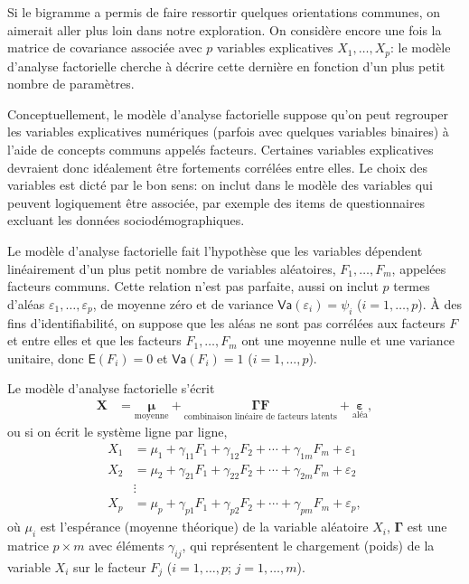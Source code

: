 \documentclass[
  11pt,
  letterpaper,
]{book}
\theoremstyle{definition}
\theoremstyle{remark}
\begin{document}
Si le bigramme a permis de faire ressortir quelques orientations
communes, on aimerait aller plus loin dans notre exploration. On
considère encore une fois la matrice de covariance associée avec \(p\)
variables explicatives \(X_1, \ldots, X_p\): le modèle d'analyse
factorielle cherche à décrire cette dernière en fonction d'un plus petit
nombre de paramètres.

Conceptuellement, le modèle d'analyse factorielle suppose qu'on peut
regrouper les variables explicatives numériques (parfois avec quelques
variables binaires) à l'aide de concepts communs appelés facteurs.
Certaines variables explicatives devraient donc idéalement être
fortements corrélées entre elles. Le choix des variables est dicté par
le bon sens: on inclut dans le modèle des variables qui peuvent
logiquement être associée, par exemple des items de questionnaires
excluant les données sociodémographiques.

Le modèle d'analyse factorielle fait l'hypothèse que les variables
dépendent linéairement d'un plus petit nombre de variables aléatoires,
\(F_1, \ldots, F_m\), appelées facteurs communs. Cette relation n'est
pas parfaite, aussi on inclut \(p\) termes d'aléas
\(\varepsilon_1, \ldots, \varepsilon_p\), de moyenne zéro et de variance
\(\mathsf{Va}(\varepsilon_i)=\psi_i\) (\(i=1, \ldots, p\)). À des fins
d'identifiabilité, on suppose que les aléas ne sont pas corrélées aux
facteurs \(F\) et entre elles et que les facteurs \(F_1, \ldots, F_m\)
ont une moyenne nulle et une variance unitaire, donc
\(\mathsf{E}(F_i)=0\) et \(\mathsf{Va}(F_i)=1\) (\(i=1, \ldots, p\)).

Le modèle d'analyse factorielle s'écrit \begin{align*}
\boldsymbol{X} &= \underset{\text{moyenne}}{\boldsymbol{\mu}} + \underset{\text{combinaison linéaire de facteurs latents}}{\boldsymbol{\Gamma}\boldsymbol{F}} + \underset{\text{aléa}}{\boldsymbol{\varepsilon}},
\end{align*} ou si on écrit le système ligne par ligne, \begin{align*}
X_1 &= \mu_1 + \gamma_{11}F_1 + \gamma_{12} F_2 + \cdots + \gamma_{1m}F_m + \varepsilon_1\\
X_2 &= \mu_2 + \gamma_{21}F_1 + \gamma_{22} F_2 + \cdots + \gamma_{2m}F_m + \varepsilon_2\\
&\vdots \\
X_p &= \mu_p + \gamma_{p1}F_1 + \gamma_{p2} F_2 + \cdots + \gamma_{pm}F_m + \varepsilon_p, 
\end{align*} où \(\mu_i\) est l'espérance (moyenne théorique) de la
variable aléatoire \(X_i\), \(\boldsymbol{\Gamma}\) est une matrice
\(p \times m\) avec éléments \(\gamma_{ij}\), qui représentent le
chargement (poids) de la variable \(X_i\) sur le facteur \(F_j\)
(\(i=1, \ldots, p\); \(j=1, \ldots, m\)).
\end{document}

